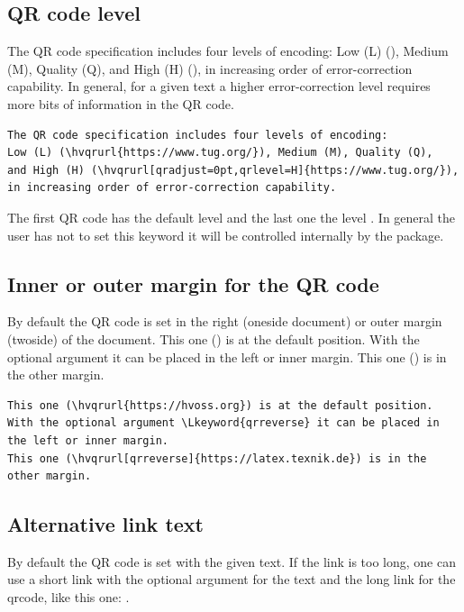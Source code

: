 \documentclass[twoside=on,usegeometry]{scrartcl}
\begin{document}
\subsection{QR code level}
The QR code specification includes four levels of encoding: 
Low (L) (), Medium (M), Quality (Q), 
and High (H) (), 
in increasing order of error-correction capability. 
In general, for a given text a higher error-correction level requires 
more bits of information in the QR code. 

\begin{lstlisting}
The QR code specification includes four levels of encoding: 
Low (L) (\hvqrurl{https://www.tug.org/}), Medium (M), Quality (Q), 
and High (H) (\hvqrurl[qradjust=0pt,qrlevel=H]{https://www.tug.org/}), 
in increasing order of error-correction capability. 
\end{lstlisting}

The first QR code has the default level  and the last one the
level . In general the user has not to set this keyword it will be
controlled internally by the package.


\subsection{Inner or outer margin for  the QR code}
By default the QR code is set in the right (oneside document) or outer margin (twoside) of the
document. This one () is at the default position.
With the optional argument  it can be placed in the left or inner margin.
This one () is in the other margin.

\begin{lstlisting}
This one (\hvqrurl{https://hvoss.org}) is at the default position.
With the optional argument \Lkeyword{qrreverse} it can be placed in the left or inner margin.
This one (\hvqrurl[qrreverse]{https://latex.texnik.de}) is in the other margin.
\end{lstlisting}

\subsection{Alternative link text}
By default the QR code is set with the given text. If the link is too long, one
can use a short link with the optional argument  for the text and 
the long link for the qrcode, like
this one: .
\end{document}
